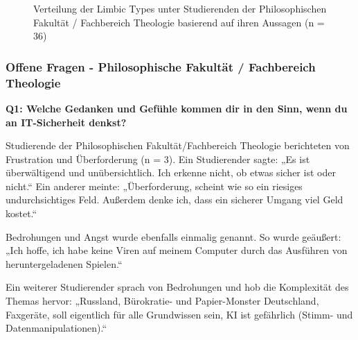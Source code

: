 \documentclass[german,report]{i1thesis}
\begin{document}
\begin{figure}[H]
\centering
{}
\caption{Verteilung der Limbic Types \cite{hausel2011wissenschaftliche} unter Studierenden der Philosophischen Fakultät / Fachbereich Theologie basierend auf ihren Aussagen (n = 36)}
\label{fig:limbic_types}
\end{figure}

\subsubsection{Offene Fragen - Philosophische Fakultät / Fachbereich Theologie}

\textbf{Q1: Welche Gedanken und Gefühle kommen dir in den Sinn, wenn du an IT-Sicherheit denkst?}

Studierende der Philosophischen Fakultät/Fachbereich Theologie berichteten von Frustration und Überforderung (n = 3). Ein Studierender sagte: „Es ist überwältigend und unübersichtlich. Ich erkenne nicht, ob etwas sicher ist oder nicht.“ Ein anderer meinte: „Überforderung, scheint wie so ein riesiges undurchsichtiges Feld. Außerdem denke ich, dass ein sicherer Umgang viel Geld kostet.“

Bedrohungen und Angst wurde ebenfalls einmalig genannt. So wurde geäußert: „Ich hoffe, ich habe keine Viren auf meinem Computer durch das Ausführen von heruntergeladenen Spielen.“

Ein weiterer Studierender sprach von Bedrohungen und hob die Komplexität des Themas hervor: „Russland, Bürokratie- und Papier-Monster Deutschland, Faxgeräte, soll eigentlich für alle Grundwissen sein, KI ist gefährlich (Stimm- und Datenmanipulationen).“
\end{document}
